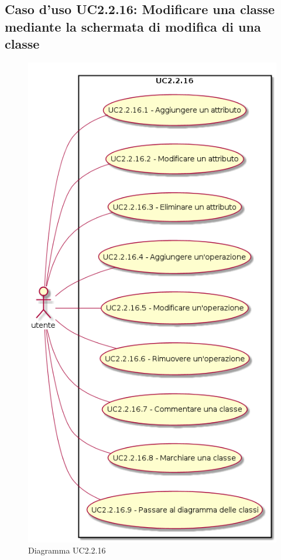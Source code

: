 \documentclass[../AnalisiDeiRequisiti.tex]{subfiles}
\begin{document}
			\subsection{Caso d'uso UC2.2.16: Modificare una classe mediante la schermata di modifica di una classe}
			\begin{figure} [H]
				\centering
				\includegraphics[scale=0.45]{./Figures/UC2-2-16.png}
				\caption{Diagramma UC2.2.16}\label{}
			\end{figure}
\end{document}
